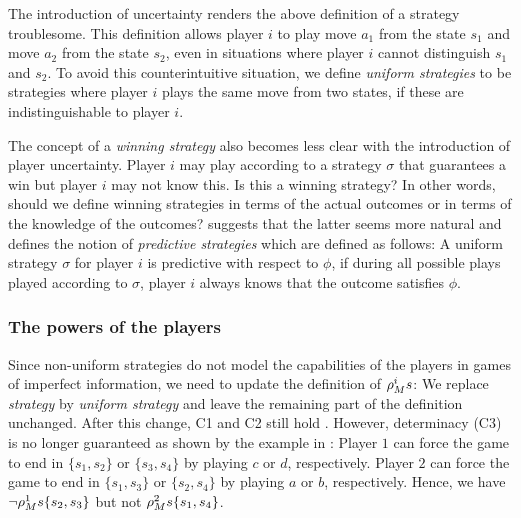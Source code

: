 The introduction of uncertainty renders the above definition of a strategy troublesome. This definition allows player $ i $ to play move $ a_{1} $ from the state $ s_{1} $ and move $ a_{2} $ from the state $ s_{2} $, even in situations where player $ i $ cannot distinguish $ s_{1} $ and $ s_{2} $. To avoid this counterintuitive situation, we define \emph{uniform strategies} to be strategies where player $ i $ plays the same move from two states, if these are indistinguishable to player $ i $.

The concept of a \emph{winning strategy} also becomes less clear with the introduction of player uncertainty. Player $ i $ may play according to a strategy $ \sigma $ that guarantees a win but player $ i $ may not know this. Is this a winning strategy? In other words, should we define winning strategies in terms of the actual outcomes or in terms of the knowledge of the outcomes? \cite{benthem2001a} suggests that the latter seems more natural and defines the notion of \emph{predictive strategies} which are defined as follows: A uniform strategy $ \sigma $ for player $ i $ is predictive with respect to $ \phi $, if during all possible plays played according to $ \sigma $, player $ i $ always knows that the outcome satisfies $ \phi $.

\subsubsection*{The powers of the players}

Since non-uniform strategies do not model the capabilities of the players in games of imperfect information, we need to update the definition of $ \rho_{M}^{ i } s $: We replace \emph{strategy} by \emph{uniform strategy} and leave the remaining part of the definition unchanged. After this change, C1 and C2 still hold \cite{benthem2001a}. However, determinacy (C3) is no longer guaranteed as shown by the example in : Player $ 1 $ can force the game to end in $ \{ s_{1}, s_{2} \} $ or $ \{ s_{3}, s_{4} \} $ by playing $ c $ or $ d $, respectively. Player $ 2 $ can force the game to end in $ \{ s_{1}, s_{3} \} $ or $ \{ s_{2}, s_{4} \} $ by playing $ a $ or $ b $, respectively. Hence, we have $ \neg \rho_{M}^{ 1 } s\{ s_{2}, s_{3} \} $ but not $ \rho_{M}^{ 2 } s\{ s_{1}, s_{4} \} $.

